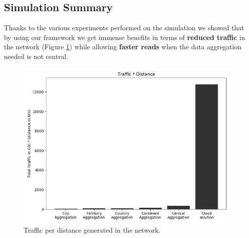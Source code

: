 \subsection{Simulation Summary}
Thanks to the various experiments performed on the simulation we showed that by using our framework we get immense benefits in terms of \textbf{reduced traffic} in the network (Figure \ref{fig:write-by-traffic1}) while allowing \textbf{faster reads} when the data aggregation needed is not central.

\begin{figure}
    \centering
    \includegraphics[width=0.99\linewidth]{Figures/Evaluation/write-by-traffic1-simplified.png}
    \caption{Traffic per distance generated in the network.}
    \label{fig:write-by-traffic1}
\end{figure}

